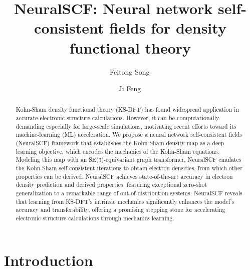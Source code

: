 \documentclass[%
reprint,
superscriptaddress,
bibnotes,
amsmath,amssymb,
aps,
floatfix, %
]{revtex4-2}
\begin{document}
\title{{NeuralSCF}: Neural network self-consistent fields for density functional theory}

\author{Feitong Song\,}
%

\author{Ji Feng\,}
%

\begin{abstract}
Kohn-Sham density functional theory (KS-DFT) has found widespread application in accurate electronic structure calculations. However, it can be computationally demanding especially for large-scale simulations, motivating recent efforts toward its machine-learning (ML) acceleration. We propose a neural network self-consistent fields (NeuralSCF) framework that establishes the Kohn-Sham density map as a deep learning objective, which encodes the mechanics of the Kohn-Sham equations. Modeling this map with an SE(3)-equivariant graph transformer, NeuralSCF emulates the Kohn-Sham self-consistent iterations to obtain electron densities, from which other properties can be derived. NeuralSCF achieves state-of-the-art accuracy in electron density prediction and derived properties, featuring exceptional zero-shot generalization to a remarkable range of out-of-distribution systems. NeuralSCF reveals that learning from KS-DFT’s intrinsic mechanics significantly enhances the model’s accuracy and transferability, offering a promising stepping stone for accelerating electronic structure calculations through mechanics learning.
\end{abstract}%

 \maketitle

\section{\label{sec:intro}Introduction}
\end{document}
